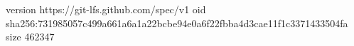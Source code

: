 version https://git-lfs.github.com/spec/v1
oid sha256:731985057c499a661a6a1a22bcbe94e0a6f22fbba4d3cae11f1c3371433504fa
size 462347
